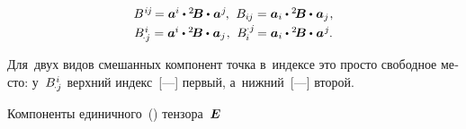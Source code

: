 \begin{otherlanguage}{russian}
\begin{equation}
\begin{array}{c}
%
\somebivalenttensorcomponentsupper{i\hspace{-0.1ex}j} \hspace{-0.25ex} = \bm{a}^{\hspace{-0.05ex}i} \dotp \somebivalenttensor \dotp \hspace{.1ex} \bm{a}^{\hspace{.05ex}j} \hspace{-0.2ex}, \:\,
\somebivalenttensorcomponents{i\hspace{-0.1ex}j} = \bm{a}_i \dotp \somebivalenttensor \dotp \hspace{.1ex} \bm{a}_j \hspace{.1ex}, \\[0.25em]
%
\somebivalenttensorcomponents{\hspace{-0.2ex} \cdot j}^{\hspace{.1ex}i} = \bm{a}^{\hspace{-0.05ex}i} \dotp \somebivalenttensor \dotp \hspace{.1ex} \bm{a}_j \hspace{.1ex}, \:\,
\somebivalenttensorcomponents{\hspace{-0.1ex}i}^{\hspace{-0.05ex} \cdot j} \hspace{-0.2ex} = \bm{a}_i \dotp \somebivalenttensor \dotp \hspace{.1ex} \bm{a}^{\hspace{.1ex}j} \hspace{-0.1ex}.
\end{array}\end{equation}

\vspace{-0.1em}\noindent
Для~двух видов смешанных компонент точка в~индексе это просто свободное место:
у~${ B_{\hspace{-0.2ex} \cdot j}^{\hspace{.1ex}i} }$
верхний индекс~[---]
первый,
а~ниж\-ний~[---]
второй.

Компоненты
единичного~()
тензора~$\bm{E}$


\end{otherlanguage}
